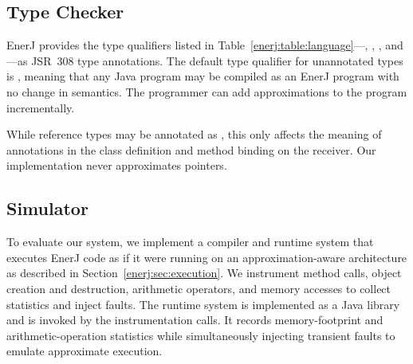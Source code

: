 \subsection{Type Checker}
\label{enerj:checker}
EnerJ provides the type qualifiers listed
in Table~\ref{enerj:table:language}---, ,
, and ---as JSR~308 type annotations.
The default type qualifier for unannotated types is , meaning
that any Java program may be compiled as an EnerJ program with no change in
semantics. The programmer can add approximations to the
program incrementally.



While reference types may be annotated as , this only affects
the meaning of  annotations in the class definition and
method binding on the receiver. Our implementation never
approximates pointers.


\subsection{Simulator}
To evaluate our system, we implement a compiler and runtime
system that executes EnerJ code as if it were running on an
approximation-aware architecture
as described in Section~\ref{enerj:sec:execution}. We instrument method calls,
object creation and destruction, arithmetic operators, and memory
accesses to collect statistics and inject faults.
The runtime system is implemented as a Java library and is invoked by the
instrumentation calls.
It records memory-footprint and arithmetic-operation statistics
while simultaneously injecting transient faults to emulate approximate
execution.

